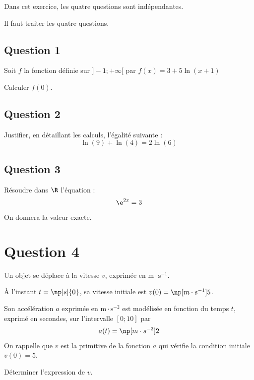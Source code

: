 Dans cet exercice, les quatre questions sont indépendantes.

Il faut traiter les quatre questions.

\subsection*{Question 1}
	Soit $f$ la fonction définie sur $]-1 ;+\infty[$ par \quad $f(x)=3+5 \ln (x+1)$

	Calculer $f(0)$.

\subsection*{Question 2}
	Justifier, en détaillant les calculs, l'égalité suivante :
	\[\ln (9)+\ln (4)=2 \ln (6)\]

\subsection*{Question 3}
	Résoudre dans $\R$ l'équation :
	\[\e^{2 x}=3\]
	On donnera la valeur exacte.

\section*{Question 4}
	Un objet se déplace à la vitesse $v$, exprimée en $\mathrm{m} \cdot \mathrm{s}^{-1}$.

	À l'instant $t=\np[s]{0}$, sa vitesse initiale est $v(0)=\np[m\cdot s^{-1}]{5}$.

	Son accélération $a$ exprimée en $\mathrm{m} \cdot \mathrm{s}^{-2}$ est modélisée en fonction du temps $t$, exprimé en secondes, sur l'intervalle $[0 ; 10]$ par
	\[a(t)=\np[m\cdot s^{-2}]{2}\]
	On rappelle que $v$ est la primitive de la fonction $a$ qui vérifie la condition initiale $v(0)=5$.

	Déterminer l'expression de $v$.
